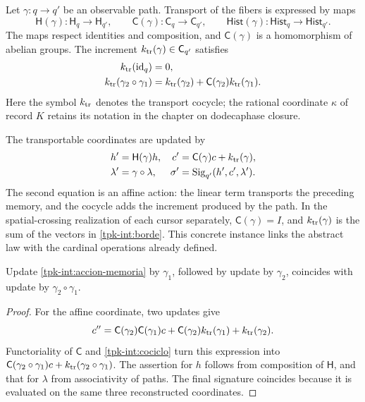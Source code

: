 Let \(\gamma:q\to q'\) be an observable path. Transport
of the fibers is expressed by maps
\[
 \mathsf H(\gamma):\mathsf H_q\to\mathsf H_{q'},\qquad
 \mathsf C(\gamma):\mathsf C_q\to\mathsf C_{q'},\qquad
 \mathsf{Hist}(\gamma):\mathsf{Hist}_q\to\mathsf{Hist}_{q'}.
\]
The maps respect identities and composition, and
\(\mathsf C(\gamma)\) is a homomorphism of abelian groups.
The increment \(k_{\rm tr}(\gamma)\in\mathsf C_{q'}\) satisfies
\begin{equation}
 \begin{split}
 k_{\rm tr}(\operatorname{id}_q)&=0,\\
 k_{\rm tr}(\gamma_2\circ\gamma_1)
 &=k_{\rm tr}(\gamma_2)+
   \mathsf C(\gamma_2)k_{\rm tr}(\gamma_1).
 \end{split}
 \label{tpk-int:cociclo}
\end{equation}
Here the symbol \(k_{\rm tr}\) denotes the transport cocycle;
the rational coordinate \(\kappa\) of record \(K\) retains
its notation in the chapter on dodecaphase closure.

The transportable coordinates are updated by
\begin{equation}
 \begin{aligned}
 h'&=\mathsf H(\gamma)h,&
 c'&=\mathsf C(\gamma)c+k_{\rm tr}(\gamma),\\
 \lambda'&=\gamma\circ\lambda,&
 \sigma'&=\operatorname{Sig}_{q'}(h',c',\lambda').
 \end{aligned}
 \label{tpk-int:accion-memoria}
\end{equation}
The second equation is an affine action: the linear term transports
the preceding memory, and the cocycle adds the increment produced by the
path. In the spatial-crossing realization of each cursor separately,
\(\mathsf C(\gamma)=I\), and \(k_{\rm tr}(\gamma)\) is the sum
of the vectors in \eqref{tpk-int:borde}. This concrete instance
links the abstract law with the cardinal operations already defined.

\begin{proposition}
\label{tpk-int:composicion-memoria}
Update \eqref{tpk-int:accion-memoria} by
\(\gamma_1\), followed by update by \(\gamma_2\),
coincides with update by \(\gamma_2\circ\gamma_1\).
\end{proposition}
\begin{proof}
For the affine coordinate, two updates give
\[
 c''=\mathsf C(\gamma_2)\mathsf C(\gamma_1)c
       +\mathsf C(\gamma_2)k_{\rm tr}(\gamma_1)
       +k_{\rm tr}(\gamma_2).
\]
Functoriality of \(\mathsf C\) and
\eqref{tpk-int:cociclo} turn this expression into
\(\mathsf C(\gamma_2\circ\gamma_1)c+
k_{\rm tr}(\gamma_2\circ\gamma_1)\).
The assertion for \(h\) follows from composition of
\(\mathsf H\), and that for \(\lambda\) from associativity of
paths. The final signature coincides because it is evaluated on the same
three reconstructed coordinates.
\end{proof}

